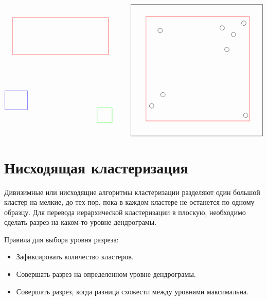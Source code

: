 \documentclass[12pt, a4paper]{article}
\begin{document}
\[\begin{tikzpicture}
\begin{scope}[yshift=-9cm]
        \draw[red] (-2.3, 0.83) rectangle (2.8, 2.8);
        \draw[blue] (-2.7, -2.1) rectangle (-1.5, -1.1);
        \draw[green] (2.2, -2.8) rectangle (3, -2);
    \end{scope}
    \begin{scope}[yshift=-9cm, xshift=7.5cm]
        \draw (-3.5, 3.5) -- (3.5, 3.5);
        \draw (-3.5, -3.5) -- (3.5, -3.5);
        \draw (-3.5, -3.5) -- (-3.5, 3.5);
        \draw (3.5, 3.5) -- (3.5, -3.5);
        
        \draw (2.5, 2.5) circle (0.12);
        \draw (1.35, 2.25) circle (0.12);
        \draw (1.6, 1.1) circle (0.12);
        \draw (1.95, 1.9) circle (0.12);
        \draw (-2.4, -1.9) circle (0.12);
        \draw (-1.8, -1.3) circle (0.12);
        \draw (-1.95, 2.11) circle (0.12);
        \draw (2.6, -2.4) circle (0.12);
        
        \draw[red] (-2.7, -2.7) rectangle (2.8, 2.85);
    \end{scope}
\end{tikzpicture}
\]

\section*{Нисходящая кластеризация}

Дивизимные или нисходящие алгоритмы кластеризации разделяют один большой кластер на мелкие, до тех пор, пока в каждом кластере не останется по одному образцу. Для перевода иерархической кластеризации в плоскую, необходимо сделать разрез на каком-то уровне дендрограмы. 

Правила для выбора уровня разреза:
\begin{itemize} 
\item Зафиксировать количество кластеров.


\item Совершать разрез на определенном уровне дендрограмы. 


\item Совершать разрез, когда разница схожести между уровнями максимальна. 
\end{itemize}
\end{document}
